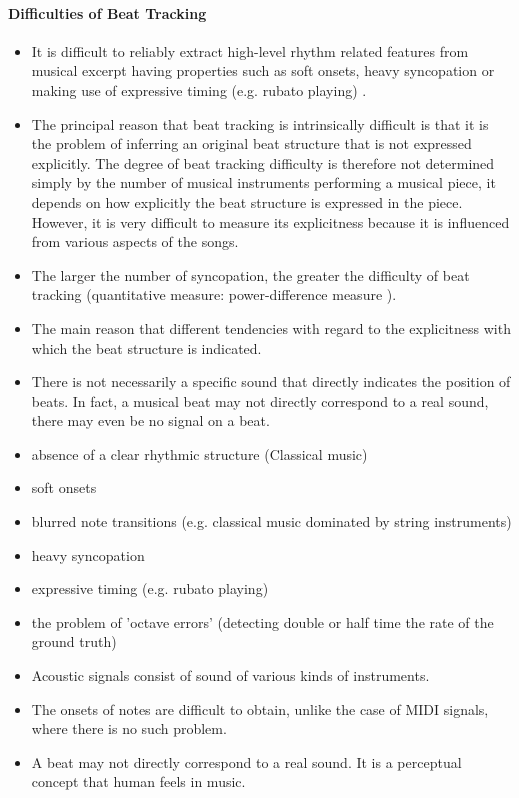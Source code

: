 \documentclass{scrartcl}
\begin{document}
\paragraph{Difficulties of Beat Tracking}
\label{sec:difficulties}
\begin{itemize}
\item It is difficult to reliably extract high-level rhythm related features from musical excerpt having properties such as soft onsets, heavy syncopation or making use of expressive timing (e.g. rubato playing) \cite{Quinton2016}.
\item The principal reason that beat tracking is intrinsically difficult is that it is the problem of inferring an original beat structure that is not expressed explicitly. The degree of beat tracking difficulty is therefore not determined simply by the number of musical instruments performing a musical piece, it depends on how explicitly the beat structure is expressed in the piece. However, it is very difficult to measure its explicitness because it is influenced from various aspects of the songs.
\item The larger the number of syncopation, the greater the difficulty of beat tracking (quantitative measure: power-difference measure \cite{Goto1999}).
\item The main reason that different tendencies with regard to the explicitness with which the beat structure is indicated.
\item There is not necessarily a specific sound that directly indicates the position of beats. In fact, a musical beat may not directly correspond to a real sound, there may even be no signal on a beat. 
\item absence of a clear rhythmic structure (Classical music)
\item soft onsets
\item blurred note transitions (e.g. classical music dominated by string instruments)
\item heavy syncopation
\item expressive timing (e.g. rubato playing)
\item the problem of 'octave errors' (detecting double or half time the rate of the ground truth)
\item Acoustic signals consist of sound of various kinds of instruments.
\item The onsets of notes are difficult to obtain, unlike the case of MIDI signals, where there is no such problem.
\item A beat may not directly correspond to a real sound. It is a perceptual concept that human feels in music. 

\end{itemize}
\end{document}
